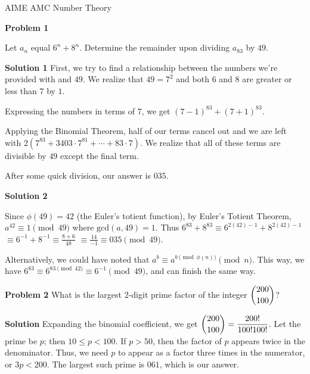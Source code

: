 \documentclass[a4paper,11pt]{article}
\begin{document}
\begin{center}
\begin{LARGE}
AIME AMC Number Theory
\end{LARGE}
\end{center}

\textbf{Problem 1}

Let $a_n$ equal $6^{n}+8^{n}$. Determine the remainder upon dividing $a_ {83}$ by $49$.

\textbf{Solution 1}
First, we try to find a relationship between the numbers we're provided with and $49$. We realize that $49=7^2$ and both $6$ and $8$ are greater or less than $7$ by $1$.

Expressing the numbers in terms of $7$, we get $(7-1)^{83}+(7+1)^{83}$.

Applying the Binomial Theorem, half of our terms cancel out and we are left with $2(7^{83}+3403\cdot7^{81}+\cdots + 83\cdot7)$. We realize that all of these terms are divisible by $49$ except the final term.

After some quick division, our answer is $\boxed{035}$.

\textbf{Solution 2}

Since $\phi(49) = 42$ (the Euler's totient function), by Euler's Totient Theorem, $a^{42} \equiv 1 \pmod{49}$ where $\text{gcd}(a,49) = 1$. Thus $6^{83} + 8^{83} \equiv 6^{2(42)-1}+8^{2(42)-1}$  $\equiv 6^{-1} + 8^{-1} \equiv \frac{8+6}{48}$ $\equiv \frac{14}{-1}\equiv \boxed{035} \pmod{49}$.

Alternatively, we could have noted that $a^b\equiv a^{b\pmod{\phi{(n)}}}\pmod n$. This way, we have $6^{83}\equiv 6^{83\pmod {42}}\equiv 6^{-1}\pmod {49}$, and can finish the same way.

\textbf{ Problem 2}
What is the largest 2-digit prime factor of the integer $\mathlarger{{200\choose 100}}$?

\textbf{Solution}
Expanding the binomial coefficient, we get $\mathlarger{{200 \choose 100}=\frac{200!}{100!100!}}$. Let the prime be $p$; then $10 \le p < 100$. If $p > 50$, then the factor of $p$ appears twice in the denominator. Thus, we need $p$ to appear as a factor three times in the numerator, or $3p<200$. The largest such prime is $\boxed{061}$, which is our answer.
 
 
 
\end{document}

